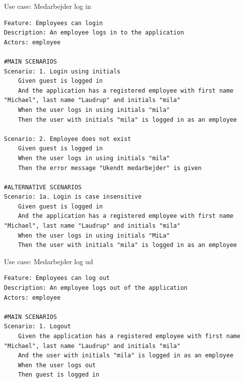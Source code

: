 \begin{listing}[H]
    \centering
    \caption{Use case: Medarbejder log in}\label{lst:usecase_login}
    \begin{verbatim}  
Feature: Employees can login
Description: An employee logs in to the application
Actors: employee

#MAIN SCENARIOS
Scenario: 1. Login using initials
    Given guest is logged in
    And the application has a registered employee with first name "Michael", last name "Laudrup" and initials "mila"
    When the user logs in using initials "mila" 
    Then the user with initials "mila" is logged in as an employee

Scenario: 2. Employee does not exist
    Given guest is logged in
    When the user logs in using initials "mila" 
    Then the error message "Ukendt medarbejder" is given

#ALTERNATIVE SCENARIOS
Scenario: 1a. Login is case insensitive
    Given guest is logged in
    And the application has a registered employee with first name "Michael", last name "Laudrup" and initials "mila"
    When the user logs in using initials "MiLa" 
    Then the user with initials "mila" is logged in as an employee
    \end{verbatim}
\end{listing}
\begin{listing}[H]
    \centering
    \caption{Use case: Medarbejder log ud}\label{lst:usecase_logout}
    \begin{verbatim}  
Feature: Employees can log out
Description: An employee logs out of the application
Actors: employee

#MAIN SCENARIOS
Scenario: 1. Logout
    Given the application has a registered employee with first name "Michael", last name "Laudrup" and initials "mila"
    And the user with initials "mila" is logged in as an employee
    When the user logs out
    Then guest is logged in
    \end{verbatim}
\end{listing}
